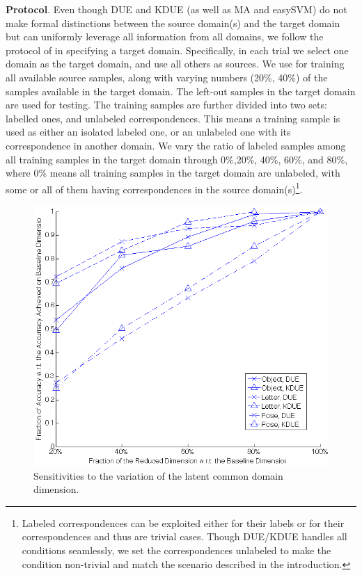 \documentclass[10pt,twocolumn,letterpaper]{article}
\begin{document}
\noindent\textbf{Protocol}. Even though DUE and KDUE (as well as MA and easySVM) do not make formal distinctions between the source domain(s) and the target domain but can uniformly leverage all information from all domains, we follow the protocol of \cite{Saenko:ML,Kulis:ML,Gopalan:Grassmann} in specifying a target domain. Specifically, in each trial we select one domain as the target domain, and use all others as sources. We use for training all available source samples, along with varying numbers (20\%, 40\%) of the samples available in the target domain. The left-out samples in the target domain are used for testing. The training samples are further divided into two sets: labelled ones, and unlabeled correspondences. This means a training sample is used as either an isolated labeled one, or an unlabeled one with its correspondence in another domain. We vary the ratio of labeled samples among all training samples in the target domain through 0\%,20\%, 40\%, 60\%, and 80\%, where 0\% means all training samples in the target domain are unlabeled, with some or all of them having correspondences in the source domain(s)\footnote{Labeled correspondences can be exploited either for their labels or for their correspondences and thus are trivial cases. Though DUE/KDUE handles all conditions seamlessly, we set the correspondences unlabeled to make the condition non-trivial and match the scenario described in the introduction.}.


\begin{figure}
\begin{center}
\includegraphics[scale=0.25]{sensi_new.png}
\end{center}
\caption{Sensitivities to the variation of the latent common domain dimension.}
\label{sensi}
\end{figure}
\end{document}
